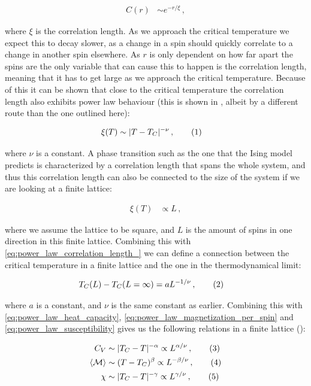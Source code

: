 \documentclass[reprint,english,notitlepage]{revtex4-1}  %
\newcommand\numberthis{\addtocounter{equation}{1}\tag{\theequation}}
\begin{document}
\begin{align*}
C(r) &\sim  e^{-r/\xi} \, ,
\end{align*}

where $\xi$ is the correlation length. As we approach the critical temperature we expect this to decay slower, as a change in a spin should quickly correlate to a change in another spin elsewhere. As $r$ is only dependent on how far apart the spins are the only variable that can cause this to happen is the correlation length, meaning that it has to get large as we approach the critical temperature. Because of this it can be shown that close to the critical temperature the correlation length also exhibits power law behaviour  (this is shown in \citep{Stanley1999}, albeit by a different route than the one outlined here):

\begin{align*}
\xi (T) &\sim |T-T_C|^{-\nu} \, , \numberthis \label{eq:power_law_correlation_length_} 
\end{align*}

where $\nu$ is a constant. A phase transition such as the one that the Ising model predicts is characterized by a correlation length that spans the whole system, and thus this correlation length can also be connected to the size of the system if we are looking at a finite lattice:

\begin{align*}
\xi (T) &\propto L \, ,
\end{align*}

where we assume the lattice to be square, and $L$ is the amount of spins in one direction in this finite lattice. Combining this with \eqref{eq:power_law_correlation_length_} we can define a connection between the critical temperature in a finite lattice and the one in the thermodynamical limit:

\begin{align*}
T_C(L) - T_C(L= \infty) &= aL^{-1/\nu} \, , \numberthis \label{eq:crit_temperature_finite_lattice} 
\end{align*}

where $a$ is a constant, and $\nu$ is the same constant as earlier. Combining this with \eqref{eq:power_law_heat_capacity}, \eqref{eq:power_law_magnetization_per_spin} and \eqref{eq:power_law_susceptibility} gives us the following relations in a finite lattice (\citep[p.78]{landau_binder_2014}):

\begin{align*}
C_V &\sim |T_C - T |^{-\alpha} \propto  L^{\alpha/\nu} \, , \numberthis \label{eq:finite_lattice_heat_capacity} \\
\langle \mathcal M \rangle &\sim (T-T_C)^\beta \propto L^{-\beta /\nu} \, , \numberthis \label{eq:finite_lattice_magnetization_per_spin} \\
\chi &\sim |T_C - T|^{-\gamma} \propto L^{\gamma/\nu} \, , \numberthis \label{eq:finite_lattice_susceptibility}
\end{align*}
\end{document}
